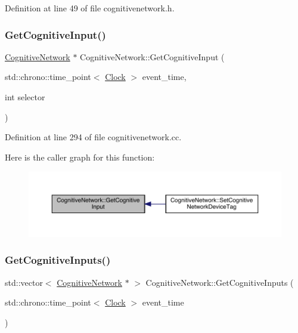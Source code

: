 Definition at line 49 of file cognitivenetwork.\+h.

\mbox{\label{class_cognitive_network_a2ff68a0d11cdb29af2f05a69a11911a4}} 
\subsubsection{\texorpdfstring{Get\+Cognitive\+Input()}{GetCognitiveInput()}}
{\footnotesize\ttfamily \hyperlink{class_cognitive_network}{Cognitive\+Network} $\ast$ Cognitive\+Network\+::\+Get\+Cognitive\+Input (\begin{DoxyParamCaption}\item[{std\+::chrono\+::time\+\_\+point$<$ \hyperlink{universe_8h_a0ef8d951d1ca5ab3cfaf7ab4c7a6fd80}{Clock} $>$}]{event\+\_\+time,  }\item[{int}]{selector }\end{DoxyParamCaption})}



Definition at line 294 of file cognitivenetwork.\+cc.

Here is the caller graph for this function\+:
\nopagebreak
\begin{figure}[H]
\begin{center}
\leavevmode
\includegraphics[width=350pt]{class_cognitive_network_a2ff68a0d11cdb29af2f05a69a11911a4_icgraph}
\end{center}
\end{figure}
\mbox{\label{class_cognitive_network_a92b896643b881e4030401e0f7fd256bf}} 
\subsubsection{\texorpdfstring{Get\+Cognitive\+Inputs()}{GetCognitiveInputs()}}
{\footnotesize\ttfamily std\+::vector$<$ \hyperlink{class_cognitive_network}{Cognitive\+Network} $\ast$ $>$ Cognitive\+Network\+::\+Get\+Cognitive\+Inputs (\begin{DoxyParamCaption}\item[{std\+::chrono\+::time\+\_\+point$<$ \hyperlink{universe_8h_a0ef8d951d1ca5ab3cfaf7ab4c7a6fd80}{Clock} $>$}]{event\+\_\+time }\end{DoxyParamCaption})}



